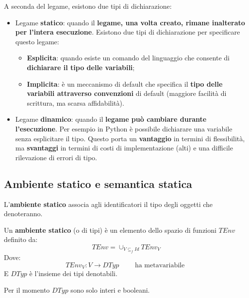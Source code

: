 \documentclass[a4paper]{article}
\begin{document}
	A seconda del legame, esistono due tipi di dichiarazione:
	\begin{itemize}
		\item Legame \textbf{statico}: quando il \textbf{legame, una volta creato, rimane inalterato per l'intera esecuzione}. Esistono due tipi di dichiarazione per specificare questo legame:
		\begin{itemize}
			\item \textcolor{Red3}{\textbf{Esplicita}}: quando esiste un comando del linguaggio che consente di \textbf{dichiarare il tipo delle variabili};
			
			\item \textcolor{Red3}{\textbf{Implicita}}: è un meccanismo di default che specifica il \textbf{tipo delle variabili attraverso convenzioni} di default (maggiore facilità di scrittura, ma scarsa affidabilità).
		\end{itemize}
		
		\item Legame \textbf{dinamico}: quando il \textbf{legame può cambiare durante l'esecuzione}. Per esempio in Python è possibile dichiarare una variabile senza esplicitare il tipo. Questo porta un \textcolor{Green4}{\textbf{vantaggio}} in termini di flessibilità, ma \textcolor{Red3}{\textbf{svantaggi}} in termini di costi di implementazione (alti) e una difficile rilevazione di errori di tipo.
	\end{itemize}
	
	\subsection{Ambiente statico e semantica statica}
	
	L'\textbf{ambiente statico} associa agli identificatori il tipo degli oggetti che denoteranno.
	\begin{boxdef}
		Un \textcolor{Red3}{\textbf{ambiente statico}} (o di tipi) è un elemento dello spazio di funzioni $TEnv$ definito da:
		\begin{equation*}
			TEnv = \cup_{V \subseteq_{f} Id} TEnv_{V}
		\end{equation*}
		Dove:
		\begin{equation*}
			TEnv_{V} : V \rightarrow DTyp \hspace{2em} \text{ ha metavariabile }
		\end{equation*}
		E $DTyp$ è l'insieme dei tipi denotabili.
	\end{boxdef}

	\noindent
	Per il momento $DTyp$ sono solo interi e booleani.\newline
	
\end{document}
